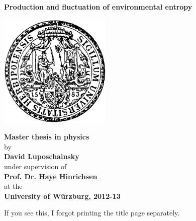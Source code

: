\titlepage
\vspace*{1em}
\begin{center}
	\LARGE{\bfseries
		Production and fluctuation of environmental entropy
	}

	\vfill %

	\begin{center}
		\includegraphics[width=0.4\textwidth]{figures/unilogo.pdf}
	\end{center}

	\vfill %

	{\Large \bfseries Master thesis in physics} \\ [0.5cm]
	{\small by} \\
	{\Large \bfseries David Luposchainsky} \\ [0.5 cm]
	{\small under supervision of} \\
	{\Large \bfseries Prof. Dr. Haye Hinrichsen} \\ [0.5 cm]
	{\small at the} \\
	{\Large \bfseries University of W\"urzburg, 2012-13
	}

\end{center}
\newpage
If you see this, I forgot printing the title page separately.










